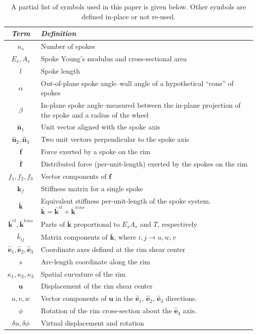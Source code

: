 \documentclass{bmd2016p}
\newcommand{\e}{\ensuremath{\hat{\bm{e}}_1}}
\newcommand{\ee}{\ensuremath{\hat{\bm{e}}_2}}
\newcommand{\eee}{\ensuremath{\hat{\bm{e}}_3}}
\newcommand{\n}{\ensuremath{\hat{\bm{n}}_1}}
\newcommand{\nn}{\ensuremath{\hat{\bm{n}}_2}}
\newcommand{\nnn}{\ensuremath{\hat{\bm{n}}_3}}
\begin{document}
\begin{table}[ht!]
\caption{A partial list of symbols used in this paper is given below. Other symbols are defined in-place or not re-used.}
\begin{tabular}{c|p{12cm}}
\hline
\textit{\textbf{Term}} & \textit{\textbf{Definition}} \\
\hline
$n_s$		& Number of spokes\\
$E_s, A_s$	& Spoke Young's modulus and cross-sectional area\\
$l$			& Spoke length\\
$\alpha$	& Out-of-plane spoke angle--wall angle of a hypothetical ``cone'' of spokes\\
$\beta$		& In-plane spoke angle--measured between the in-plane projection of the spoke and
			  a radius of the wheel\\
$\n$		& Unit vector aligned with the spoke axis\\
$\nn,\nnn$	& Two unit vectors perpendicular to the spoke axis\\
$\bm{f}$	& Force exerted by a spoke on the rim\\
$\bar{\bm{f}}$& Distributed force (per-unit-length) exerted by the spokes on the rim\\
$f_1, f_2,f_3$ & Vector components of $\bm{f}$\\
$\bm{k}_f$	& Stiffness matrix for a single spoke\\
$\bar{\bm{k}}$ & Equivalent stiffness per-unit-length of the spoke system. $\bar{\bm{k}} = \bar{\bm{k}}^{el} + \bar{\bm{k}}^{tens}$\\
$\bar{\bm{k}}^{el},\bar{\bm{k}}^{tens}$ & Parts of $\bar{\bm{k}}$ proportional to $E_sA_s$ and $T$, respectively\\
$\bar{k}_{ij}$ & Matrix components of $\bar{\bm{k}}$, where $i,j\rightarrow u,w,v$ \\
$\e,\ee,\eee$ & Coordinate axes defined at the rim shear center\\
$s$			& Arc-length coordinate along the rim\\
$\kappa_1,\kappa_2,\kappa_3$ & Spatial curvature of the rim\\
$\bm{u}$	& Displacement of the rim shear center\\
$u,v,w$		& Vector components of $\bm{u}$ in the \e{}, \ee{}, \eee{} directions.\\
$\phi$		& Rotation of the rim cross-section about the $\hat{\bm{e}}_3$ axis.\\
$\delta u, \delta \phi$ & Virtual displacement and rotation\\

\end{tabular}
\end{table}
\end{document}
